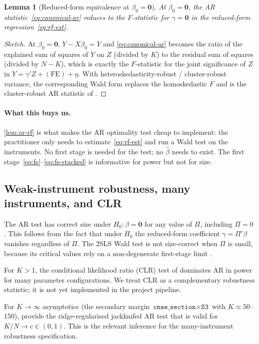 \documentclass{article}
\newcommand{\bzero}{\mathbf{0}}
\theoremstyle{plain}
\newtheorem{lemma}{Lemma}
\theoremstyle{definition}
\theoremstyle{remark}
\begin{document}
\begin{lemma}[Reduced-form equivalence at $\beta_0=\bzero$]\label{lem:ar-rf}
At $\beta_0=\bzero$, the AR statistic~\eqref{eq:canonical-ar} reduces to the
$F$-statistic for $\gamma=\bzero$ in the reduced-form
regression~\eqref{eq:rf-est}.
\end{lemma}
\begin{proof}[Sketch]
At $\beta_0=\bzero$, $Y-X\beta_0=Y$ and \eqref{eq:canonical-ar} becomes the
ratio of the explained sum of squares of $Y$ on $Z$ (divided by $K$) to the
residual sum of squares (divided by $N-K$), which is exactly the
$F$-statistic for the joint significance of $Z$ in
$Y=\gamma' Z + \mathrm{(FE)} + \eta$. With heteroskedasticity-robust /
cluster-robust variance, the corresponding Wald form replaces the homoskedastic
$F$ and is the cluster-robust AR statistic of
\citet{finlay2009implementing}.
\end{proof}

\paragraph{What this buys us.}
\autoref{lem:ar-rf} is what makes the AR optimality test cheap to implement:
the practitioner only needs to estimate~\eqref{eq:rf-est} and run a Wald
test on the instruments. No first stage is needed for the test; no $\hat\beta$
needs to exist. The first stage~\eqref{eq:fs}--\eqref{eq:fs-stacked} is
informative for power but not for size.

\subsection{Weak-instrument robustness, many instruments, and CLR}

The AR test has correct size under $H_0:\beta=\bzero$ for any value of $\Pi$,
including $\Pi=0$. This follows from the fact that under $H_0$ the
reduced-form coefficient $\gamma=\Pi'\beta$ vanishes regardless of $\Pi$. The
2SLS Wald test is not size-correct when $\Pi$ is small, because its
critical values rely on a non-degenerate first-stage limit
\citep{andrews2019weak,dufour1997some}.

For $K>1$, the conditional likelihood ratio (CLR) test of
\citet{moreira2003conditional} dominates AR in power for many parameter
configurations. We treat CLR as a complementary robustness statistic; it is
not yet implemented in the project pipeline.

For $K\to\infty$ asymptotics (the secondary margin
$\texttt{cnae\_section}\times\texttt{S3}$ with $K\approx 50$--$150$),
\citet{mikusheva2022many} provide the ridge-regularised jackknifed AR test that
is valid for $K/N\to c\in(0,1)$. This is the relevant inference for the
many-instrument robustness specification.
\end{document}
